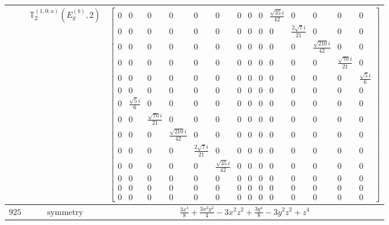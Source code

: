 \documentclass[fleqn,8pt,landscape]{jsarticle}
\begin{document}
\begin{longtable}{ccc}
$  $ & $ \mathbb{T}_{2}^{(1,0;a)}(E_{g}^{(b)},2) $ & $ \begin{bmatrix} 0 & 0 & 0 & 0 & 0 & 0 & 0 & 0 & 0 & \frac{\sqrt{35} i}{42} & 0 & 0 & 0 & 0 \\ 0 & 0 & 0 & 0 & 0 & 0 & 0 & 0 & 0 & 0 & \frac{2 \sqrt{7} i}{21} & 0 & 0 & 0 \\ 0 & 0 & 0 & 0 & 0 & 0 & 0 & 0 & 0 & 0 & 0 & \frac{\sqrt{210} i}{42} & 0 & 0 \\ 0 & 0 & 0 & 0 & 0 & 0 & 0 & 0 & 0 & 0 & 0 & 0 & \frac{\sqrt{70} i}{21} & 0 \\ 0 & 0 & 0 & 0 & 0 & 0 & 0 & 0 & 0 & 0 & 0 & 0 & 0 & \frac{\sqrt{5} i}{6} \\ 0 & 0 & 0 & 0 & 0 & 0 & 0 & 0 & 0 & 0 & 0 & 0 & 0 & 0 \\ 0 & \frac{\sqrt{5} i}{6} & 0 & 0 & 0 & 0 & 0 & 0 & 0 & 0 & 0 & 0 & 0 & 0 \\ 0 & 0 & \frac{\sqrt{70} i}{21} & 0 & 0 & 0 & 0 & 0 & 0 & 0 & 0 & 0 & 0 & 0 \\ 0 & 0 & 0 & \frac{\sqrt{210} i}{42} & 0 & 0 & 0 & 0 & 0 & 0 & 0 & 0 & 0 & 0 \\ 0 & 0 & 0 & 0 & \frac{2 \sqrt{7} i}{21} & 0 & 0 & 0 & 0 & 0 & 0 & 0 & 0 & 0 \\ 0 & 0 & 0 & 0 & 0 & \frac{\sqrt{35} i}{42} & 0 & 0 & 0 & 0 & 0 & 0 & 0 & 0 \\ 0 & 0 & 0 & 0 & 0 & 0 & 0 & 0 & 0 & 0 & 0 & 0 & 0 & 0 \\ 0 & 0 & 0 & 0 & 0 & 0 & 0 & 0 & 0 & 0 & 0 & 0 & 0 & 0 \\ 0 & 0 & 0 & 0 & 0 & 0 & 0 & 0 & 0 & 0 & 0 & 0 & 0 & 0 \end{bmatrix} $ \\ \hline
$ 925 $ & $ \text{symmetry} $ & $ \frac{3 x^{4}}{8} + \frac{3 x^{2} y^{2}}{4} - 3 x^{2} z^{2} + \frac{3 y^{4}}{8} - 3 y^{2} z^{2} + z^{4} $ \\

\end{longtable}
\end{document}
